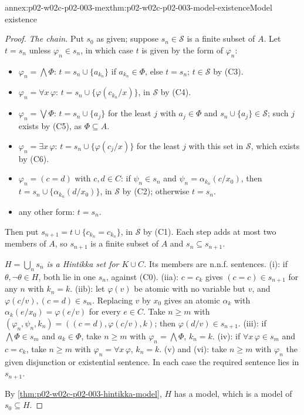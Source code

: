 \begin{annexitem}{annex:p02-w02c-p02-003-mex}{thm:p02-w02c-p02-003-model-existence}{Model existence}
\begin{proof}
\emph{The chain.}  Put \(s_0\) as given; suppose \(s_n\in\mathcal S\) is a
finite subset of \(A\).  Let \(t=s_n\) unless \(\varphi_n\in s_n\), in
which case \(t\) is given by the form of \(\varphi_n\):
\begin{itemize}
\item \(\varphi_n=\bigwedge\Phi\): \(t=s_n\cup\{a_{k_n}\}\) if
      \(a_{k_n}\in\Phi\), else \(t=s_n\); \(t\in\mathcal S\) by (C3).
\item \(\varphi_n=\forall x\,\varphi\): \(t=s_n\cup\{\varphi(c_{k_n}/x)\}\),
      in \(\mathcal S\) by (C4).
\item \(\varphi_n=\bigvee\Phi\): \(t=s_n\cup\{a_j\}\) for the least \(j\)
      with \(a_j\in\Phi\) and \(s_n\cup\{a_j\}\in\mathcal S\); such \(j\)
      exists by (C5), as \(\Phi\subseteq A\).
\item \(\varphi_n=\exists x\,\varphi\): \(t=s_n\cup\{\varphi(c_j/x)\}\) for
      the least \(j\) with this set in \(\mathcal S\), which exists by (C6).
\item \(\varphi_n=(c=d)\) with \(c,d\in C\): if \(\psi_n\in s_n\) and
      \(\psi_n=\alpha_{k_n}(c/x_0)\), then
      \(t=s_n\cup\{\alpha_{k_n}(d/x_0)\}\), in \(\mathcal S\) by (C2);
      otherwise \(t=s_n\).
\item any other form: \(t=s_n\).
\end{itemize}
Then put \(s_{n+1}=t\cup\{c_{k_n}=c_{k_n}\}\), in \(\mathcal S\) by (C1).
Each step adds at most two members of \(A\), so \(s_{n+1}\) is a finite
subset of \(A\) and \(s_n\subseteq s_{n+1}\).

\emph{\(H=\bigcup_n s_n\) is a Hintikka set for \(K\cup C\).}  Its members
are n.n.f. sentences.  (i): if \(\theta,\neg\theta\in H\), both lie in one
\(s_n\), against (C0).  (iia): \(c=c_k\) gives
\((c=c)\in s_{n+1}\) for any \(n\) with \(k_n=k\).  (iib): let
\(\varphi(v)\) be atomic with no variable but \(v\), and
\(\varphi(c/v),(c=d)\in s_m\).  Replacing \(v\) by \(x_0\) gives an atomic
\(\alpha_k\) with \(\alpha_k(e/x_0)=\varphi(e/v)\) for every \(e\in C\).
Take \(n\geq m\) with \((\varphi_n,\psi_n,k_n)=((c=d),\varphi(c/v),k)\);
then \(\varphi(d/v)\in s_{n+1}\).  (iii): if \(\bigwedge\Phi\in s_m\) and
\(a_k\in\Phi\), take \(n\geq m\) with \(\varphi_n=\bigwedge\Phi\),
\(k_n=k\).  (iv): if \(\forall x\,\varphi\in s_m\) and \(c=c_k\), take
\(n\geq m\) with \(\varphi_n=\forall x\,\varphi\), \(k_n=k\).  (v) and (vi):
take \(n\geq m\) with \(\varphi_n\) the given disjunction or existential
sentence.  In each case the required sentence lies in \(s_{n+1}\).

By \cref{thm:p02-w02c-p02-003-hintikka-model}, \(H\) has a model, which is
a model of \(s_0\subseteq H\).
\end{proof}
\end{annexitem}

